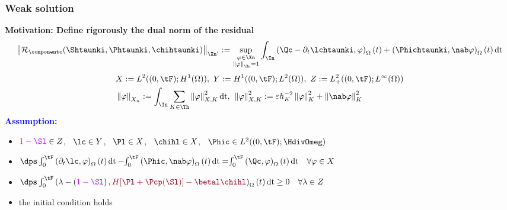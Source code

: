 \documentclass[aspectratio=169]{beamer}
\begin{document}
\begin{frame}
\frametitle{Weak solution}
\vspace{-0.2 cm}
\textcolor{cadmiumgreen}{\textbf{Motivation: Define rigorously the dual norm of the residual}}
\vspace*{-0.1 cm}
 \begin{equation*}
\left\|\mathcal{R}_{\componentc}(\Shtaunki,\Phtaunki,\chihtaunki) \right\|_{\Xn'} \egaldef \sup_{\substack{\varphi \in \Xn \\ \left\|\varphi\right\|_{\Xn} = 1}}  \int_{\In} 
 \left(\Qc - \partial_t \lchtaunki , \varphi\right)_{\Omega}(t) + \left(\Phichtaunki,\nab \varphi \right)_{\Omega}(t)\,\mathrm{dt} 
 \end{equation*}
\vspace{-0.1 cm}
\pause
\begin{equation*}
\begin{split}
&X \egaldef L^2((0,\tF);H^1(\Omega)), \ Y  \egaldef H^1((0,\tF);L^2(\Omega)), 
 \  Z \egaldef L_{+}^2((0,\tF);L^{\infty}(\Omega)) \\& \left\| \varphi \right\|_{X_n} \egaldef \int_{\In} \sum_{K \in \Th} \left\| \varphi \right\|_{X,K}^2 \mathrm{dt}, \hspace{0.15 cm} \left\| \varphi \right\|_{X,K}^2 \egaldef \varepsilon h_K^{-2} \left\|\varphi\right\|_K^2 + \left\|\nab \varphi\right\|_K^2
\end{split}
\end{equation*}
\pause
\textcolor{blue}{\textbf{Assumption:}}
\begin{itemize}
\item
$\textcolor{electricpurple}{1-\Sl} \in Z$, \ $\lc \in Y$, \ $\Pl \in X$, \ $\chihl \in X$, \ $\Phic \in L^2((0,\tF); \HdivOmeg)$
\item 
$\dps \int_{0}^{\tF} \left(\partial_t \lc, \varphi \right)_{\Omega}(t)\,\mathrm{dt}-\hspace{-0.1 cm}\int_{0}^{\tF} \left(\Phic, \nab \varphi \right)_{\Omega}(t)\,\mathrm{dt} = \hspace{-0.1 cm} \int_{0}^{\tF} \left(\Qc, \varphi \right)_{\Omega}(t)\,\mathrm{dt} \quad \forall \varphi \in X$
\item 
$\dps \int_{0}^{\tF} \left(\lambda - \left(\textcolor{electricpurple}{1 - \Sl}\right), \textcolor{carmine}{H[\Pl+\Pcp(\Sl)]-\betal \chihl}  \right)_{\Omega}(t)\,\mathrm{dt} \geq 0 \quad \forall \lambda \in Z$
\item
the initial condition  holds
\end{itemize}
\end{frame}
\end{document}
